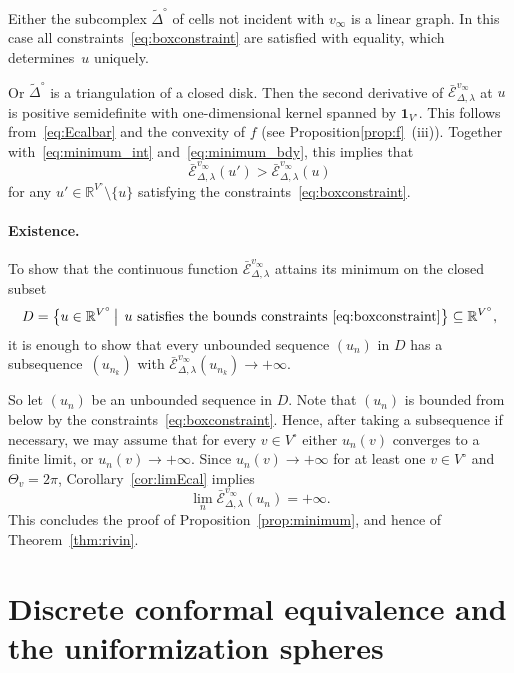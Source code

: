 \documentclass[a4paper, 11pt]{article}
\newcommand{\R}{\mathbb{R}}
\newcommand{\Deltil}{\widetilde{\Delta}}
\newcommand{\Deltilo}{\Deltil^{\circ}}
\newcommand{\Ecal}{\mathcal{E}}
\newcommand{\Ecalbar}{\bar{\Ecal}}
\newcommand{\Vo}{V^{\circ}}
\theoremstyle{plain}
\theoremstyle{definition}
\begin{document}
Either the subcomplex $\Deltilo$ of cells not incident with
$v_{\infty}$ is a linear graph. In this case all
constraints~\eqref{eq:boxconstraint} are satisfied with equality,
which determines~$u$ uniquely.

Or $\Deltilo$ is a triangulation of a closed disk. Then the second
derivative of $\Ecalbar^{v_{\infty}}_{\Delta,\lambda}$ at $u$ is
positive semidefinite with one-dimensional kernel spanned by
$\mathbf{1}_{\Vo}$. This follows from~\eqref{eq:Ecalbar} and 
the convexity of $f$ (see Proposition\ref{prop:f}~(iii)). Together
with~\eqref{eq:minimum_int} and~\eqref{eq:minimum_bdy}, this implies
that 
\begin{equation*}
  \Ecalbar^{v_{\infty}}_{\Delta,\lambda}(u')>
  \Ecalbar^{v_{\infty}}_{\Delta,\lambda}(u)
\end{equation*}
for any $u'\in\R^{\Vo}\setminus\{u\}$ satisfying the
constraints~\eqref{eq:boxconstraint}.

\paragraph{Existence.} To show that the continuous function
$\Ecalbar^{v_{\infty}}_{\Delta,\lambda}$ attains its minimum on the
closed subset 
\begin{equation*}
  D=\big\{u\in\R^{\Vo}\,\big|\,\;
  u\text{ satisfies the bounds 
    constraints~\eqref{eq:boxconstraint}}\big\}\subseteq\R^{\Vo},
\end{equation*}
it is enough to show that every unbounded sequence
$(u_{n})$ in $D$ has a subsequence~$(u_{n_{k}})$ with
$\Ecalbar^{v_{\infty}}_{\Delta,\lambda}(u_{n_{k}})\rightarrow+\infty$. 

So let $(u_{n})$ be an unbounded sequence in $D$. Note that $(u_{n})$
is bounded from below by the
constraints~\eqref{eq:boxconstraint}. Hence, after taking a
subsequence if necessary, we may assume that for every $v\in\Vo$
either $u_{n}(v)$ converges to a finite limit, or
$u_{n}(v)\rightarrow+\infty$. Since $u_{n}(v)\rightarrow+\infty$ for
at least one $v\in\Vo$ and $\Theta_{v}=2\pi$,
Corollary~\ref{cor:limEcal} implies
\begin{equation*}
  \lim_{n}\Ecalbar^{v_{\infty}}_{\Delta,\lambda}(u_{n})=+\infty.
\end{equation*}
This concludes the proof of Proposition~\ref{prop:minimum}, and hence
of Theorem~\ref{thm:rivin}.

\section{Discrete conformal equivalence and the uniformization
  spheres}
\label{sec:uniform}
\end{document}
